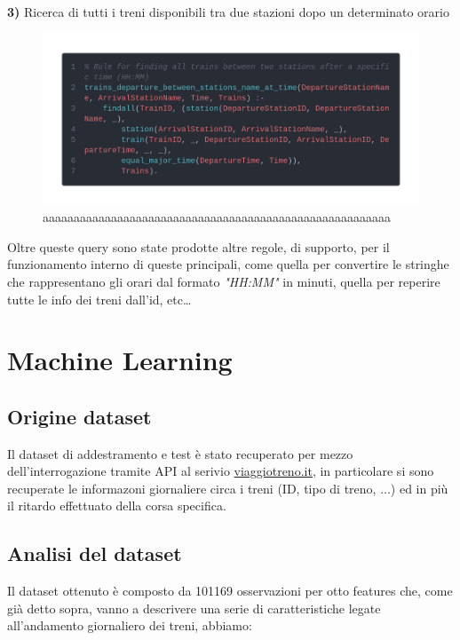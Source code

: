 \documentclass[italian,12pt,a4paper]{article}
\begin{document}
	\textbf{3)} Ricerca di tutti i treni disponibili tra due stazioni dopo un determinato orario
	\begin{figure}[!h]
		\centering
		\includegraphics[width=1.1\linewidth]{img/code4}
		\caption{aaaaaaaaaaaaaaaaaaaaaaaaaaaaaaaaaaaaaaaaaaaaaaaaaaaaaaaa}
	\end{figure}
\linebreak
	Oltre queste query sono state prodotte altre regole, di supporto, per il funzionamento interno di queste principali, come quella per convertire le stringhe che rappresentano gli orari dal formato \textit{"HH:MM"} in minuti, quella per reperire tutte le info dei treni dall'id, etc\dots

	\section{Machine Learning}
	
	\subsection{Origine dataset}
		Il dataset di addestramento e test è stato recuperato per mezzo dell'interrogazione tramite API al serivio 	\href{http://www.viaggiatreno.it/infomobilita/index.jsp}{viaggiotreno.it}, in particolare si sono recuperate le informazoni giornaliere circa i treni (ID, tipo di treno, ...) ed in più il ritardo effettuato della corsa specifica.
		
	\subsection{Analisi del dataset}
		Il dataset ottenuto è composto da 101169 osservazioni per otto features che, come già detto sopra, vanno a descrivere una serie di caratteristiche legate all'andamento giornaliero dei treni, abbiamo:
		
\end{document}
